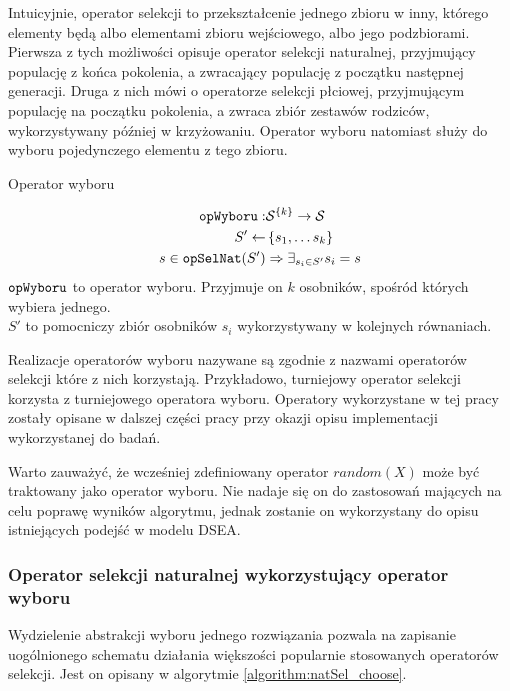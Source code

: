 \documentclass[./FM_mgr.tex]{subfiles}
\begin{document}
Intuicyjnie, operator selekcji to przekształcenie jednego zbioru w inny, którego elementy będą albo elementami zbioru wejściowego, albo jego podzbiorami.
Pierwsza z tych możliwości opisuje operator selekcji naturalnej, przyjmujący populację z końca pokolenia, a zwracający populację z początku następnej generacji.
Druga z nich mówi o operatorze selekcji płciowej, przyjmującym populację na początku pokolenia, a zwraca zbiór zestawów rodziców, wykorzystywany później w krzyżowaniu.
Operator wyboru natomiast służy do wyboru pojedynczego elementu z tego zbioru.

\begin{signature}
	\caption{Operator wyboru \label{signature:chooseOp}}
	\begin{align}
	\mathtt{opWyboru}: &{\mathcal{S}}^{ \{ k \}} \rightarrow \mathcal{S} \\
	S' \gets &\left\{ s_1, \ldots s_k \right\} \\
	s \in \mathtt{opSelNat}(S') &\Rightarrow \exists_{s_i \in S'}  s_i = s
	\end{align}
	$\mathtt{opWyboru}$ to operator wyboru.
	Przyjmuje on $k$ osobników, spośród których wybiera jednego. \\
	$S'$ to pomocniczy zbiór osobników $s_i$ wykorzystywany w kolejnych równaniach.
\end{signature}

Realizacje operatorów wyboru nazywane są zgodnie z nazwami operatorów selekcji które z nich korzystają.
Przykładowo, turniejowy operator selekcji korzysta z turniejowego operatora wyboru.
Operatory wykorzystane w tej pracy zostały opisane w dalszej części pracy przy okazji opisu implementacji wykorzystanej do badań.

Warto zauważyć, że wcześniej zdefiniowany operator $random(X)$ może być traktowany jako operator wyboru.
Nie nadaje się on do zastosowań mających na celu poprawę wyników algorytmu, jednak zostanie on wykorzystany do opisu istniejących podejść w modelu DSEA.

\subsubsection{Operator selekcji naturalnej wykorzystujący operator wyboru}

Wydzielenie abstrakcji wyboru jednego rozwiązania pozwala na zapisanie uogólnionego schematu działania większości popularnie stosowanych operatorów selekcji.
Jest on opisany w algorytmie \ref{algorithm:natSel_choose}.
\end{document}
